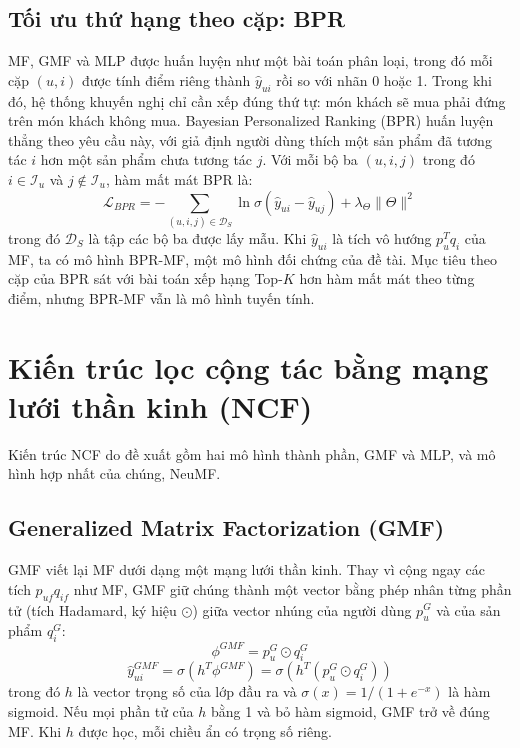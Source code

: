 \subsection{Tối ưu thứ hạng theo cặp: BPR}
\label{subsec:bpr}

MF, GMF và MLP được huấn luyện như một bài toán phân loại, trong đó mỗi cặp $(u, i)$ được tính điểm riêng thành $\hat{y}_{ui}$ rồi so với nhãn 0 hoặc 1. Trong khi đó, hệ thống khuyến nghị chỉ cần xếp đúng thứ tự: món khách sẽ mua phải đứng trên món khách không mua. Bayesian Personalized Ranking (BPR) \parencite{rendle2009bpr} huấn luyện thẳng theo yêu cầu này, với giả định người dùng thích một sản phẩm đã tương tác $i$ hơn một sản phẩm chưa tương tác $j$. Với mỗi bộ ba $(u, i, j)$ trong đó $i \in \mathcal{I}_u$ và $j \notin \mathcal{I}_u$, hàm mất mát BPR là:
\begin{equation*}
    \mathcal{L}_{BPR} = -\sum_{(u,i,j) \in \mathcal{D}_S} \ln \sigma\left(\hat{y}_{ui} - \hat{y}_{uj}\right) + \lambda_\Theta \lVert \Theta \rVert^2
\end{equation*}
trong đó $\mathcal{D}_S$ là tập các bộ ba được lấy mẫu. Khi $\hat{y}_{ui}$ là tích vô hướng $p_u^T q_i$ của MF, ta có mô hình BPR-MF, một mô hình đối chứng của đề tài. Mục tiêu theo cặp của BPR sát với bài toán xếp hạng Top-$K$ hơn hàm mất mát theo từng điểm, nhưng BPR-MF vẫn là mô hình tuyến tính.

\section{Kiến trúc lọc cộng tác bằng mạng lưới thần kinh (NCF)}
\label{sec:ncf_architecture}

Kiến trúc NCF do \textcite{he2017ncf} đề xuất gồm hai mô hình thành phần, GMF và MLP, và mô hình hợp nhất của chúng, NeuMF.

\subsection{Generalized Matrix Factorization (GMF)}
\label{subsec:gmf}

GMF viết lại MF dưới dạng một mạng lưới thần kinh. Thay vì cộng ngay các tích $p_{uf} q_{if}$ như MF, GMF giữ chúng thành một vector bằng phép nhân từng phần tử (tích Hadamard, ký hiệu $\odot$) giữa vector nhúng của người dùng $p_u^G$ và của sản phẩm $q_i^G$:
\begin{equation*}
    \phi^{GMF} = p_u^G \odot q_i^G
\end{equation*}
\begin{equation*}
    \hat{y}_{ui}^{GMF} = \sigma \left( h^T \phi^{GMF} \right) = \sigma \left( h^T (p_u^G \odot q_i^G) \right)
\end{equation*}
trong đó $h$ là vector trọng số của lớp đầu ra và $\sigma(x) = 1 / (1 + e^{-x})$ là hàm sigmoid. Nếu mọi phần tử của $h$ bằng 1 và bỏ hàm sigmoid, GMF trở về đúng MF. Khi $h$ được học, mỗi chiều ẩn có trọng số riêng.

